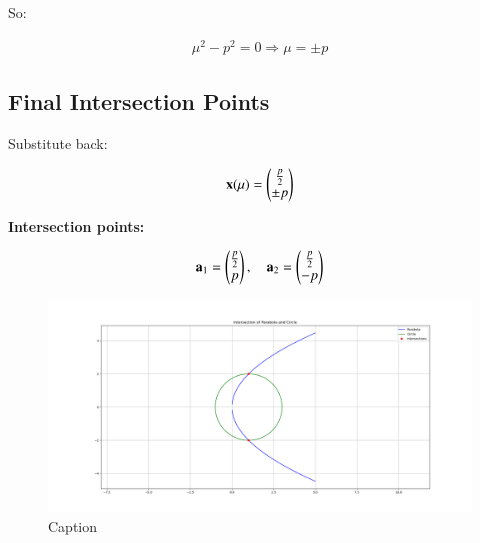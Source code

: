 \documentclass{article}
\begin{document}
So:


\begin{align}
\mu^2 - p^2 = 0 \Rightarrow \mu = \pm p
\end{align}



\subsection*{Final Intersection Points}

Substitute back:


\begin{align}
\mathbf{x}(\mu) = \begin{pmatrix}\frac{p}{2} \\ \pm p\end{pmatrix}
\end{align}



\textbf{Intersection points:}


\begin{align}
\mathbf{a}_1 = \begin{pmatrix}\frac{p}{2} \\ p\end{pmatrix}, \quad
\mathbf{a}_2 = \begin{pmatrix}\frac{p}{2} \\ -p\end{pmatrix}
\end{align}




\begin{figure}[H]
    \centering
    \includegraphics[width=0.8\linewidth]{./figs/Figure_1.png}
    \caption{Caption}
    \label{fig:placeholder}
\end{figure}
\end{document}

